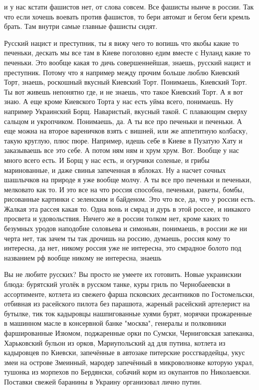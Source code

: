 и у нас кстати фашистов нет, от слова совсем. Все фашисты нынче в россии. Так
что если хочешь воевать против фашистов, то бери автомат и бегом беги кремль
брать. Там внутри самые главные фашисты сидят.

Русский нацист и преступник, ты я вижу чего то вопишь что якобы какие то
печеньки, дескать мы все там в Киеве поголовно едим вместе с Нуланд какие то
печеньки. Это вообще какая то дичь совершеннейшая, знаешь, русский нацист и
преступник. Потому что я например между прочим больше люблю Киевский Торт,
знаешь, роскошный вкусный Киевский Торт. Понимаешь, Киевский Торт. Ты вот
живешь непонятно где, и не знаешь, что такое Киевский Торт. А я вот знаю. А еще
кроме Киевского Торта у нас есть уйма всего, понимаешь. Ну например Украинский
Борщ. Наваристый, вкусный такой. С плавающим сверху сальцом и укропчиком.
Понимаешь, да. А ты все про печеньки и печеньки. А еще можна на второе
вареничков взять с вишней, или же аппетитную колбаску, такую круглую, плюс
пюре. Например, идешь себе в Киеве в Пузатую Хату и заказываешь все это себе. А
потом ням ням и хрум хрум. Вот.  Вообще у нас много всего есть. И Борщ у нас
есть, и огурчики соленые, и грибы маринованные, и даже свинья запеченная в
яблоках. Ну а насчет сочных шашлычков на природе я уже вообще молчу. А ты все
про печеньки и печеньки, мелковато как то. И это все на что россия способна,
печеньки, ракеты, бомбы, рисованные картинки с зеленским и байденом. Это что
все, да, что у россии есть. Жалкая эта рассея какая то. Одна вонь и смрад и
дурь в этой россее, и никакого просвета и удовольствия. Ничего же в россии
толком нет, кроме каких то безумных уродов наподобие соловьева и симоньян,
понимаешь, в россии же ни черта нет, так зачем ты так дрочишь на россию,
думаешь, россия кому то интересна, да нет, никому россия уже не интересна, это
смрадное болото под названием рф вообще никому не интересна, знаешь

Вы не любите русских? Вы просто не умеете их готовить. Новые украинскии блюда:
бурятский уголёк в русском танке, куры гриль по Чернобаеевски в ассортименте,
котлета из свежего фарша псковских десантников по Гостомельски, отбивная из
расейского пилота без парашюта, жареный расейский артелерист на бутылке, тик
ток кадыровцы нашпигованные хуями бурят, морячки прожаренные в машинном масле в
консервной банке "москва", генералы и полковники фаршированные Изюмом,
поджаренные орки по Сумски, Черниговская запеканка, Харьковский бульон из
орков, Мариупольский ад для путина, котлета из кадыровцев по Киевски,
запечённые в автозаке питерские россгвардейцы, укус змеи на острове Змеинный,
мародер запечённый в микроволновке которую украл, тушонка из морпехов по
Бердянски, собачий корм из окупантов по Николаевски. Поставки свежей баранины в
Украину организовал лично путин.

